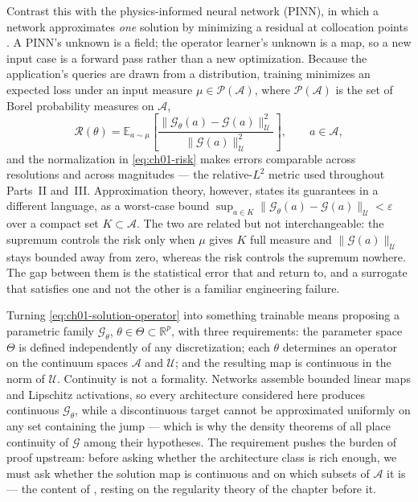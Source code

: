 Contrast this with the physics-informed neural
network (PINN), in which a network approximates
\emph{one} solution by minimizing a residual at collocation points
\cite{raissi2019physics}. A PINN's unknown is a field; the operator learner's unknown is a
map, so a new input case is a forward pass rather than a new optimization. Because the
application's queries are drawn from a distribution, training minimizes
an expected loss under an input measure
$\mu \in \mathcal{P}(\mathcal{A})$, where $\mathcal{P}(\mathcal{A})$ is the set of Borel
probability measures on $\mathcal{A}$,
\begin{equation}
  \label{eq:ch01-risk}
  \mathcal{R}(\theta)
  = \mathbb{E}_{a \sim \mu}
    \left[ \frac{\big\|\mathcal{G}_{\theta}(a) - \mathcal{G}(a)\big\|_{\mathcal{U}}^{2}}
                {\big\|\mathcal{G}(a)\big\|_{\mathcal{U}}^{2}} \right],
    \qquad a \in \mathcal{A},
\end{equation}
and the normalization in \eqref{eq:ch01-risk} makes errors comparable across resolutions and
across magnitudes --- the relative-$L^{2}$ metric used throughout Parts~II and~III. Approximation
theory, however, states its guarantees in a different language, as a worst-case bound $\sup_{a \in K} \|\mathcal{G}_{\theta}(a) -
\mathcal{G}(a)\|_{\mathcal{U}} < \varepsilon$ over a compact set $K \subset \mathcal{A}$. The
two are related but not interchangeable: the supremum controls the risk only when $\mu$ gives
$K$ full measure and $\|\mathcal{G}(a)\|_{\mathcal{U}}$ stays bounded away from zero, whereas
the risk controls the supremum nowhere. The gap between them is the statistical
error that  and
 return to, and a surrogate that
satisfies one and not the other is a familiar engineering failure.

Turning \eqref{eq:ch01-solution-operator} into something trainable means proposing a
parametric family $\mathcal{G}_{\theta}$, $\theta \in \Theta \subset \mathbb{R}^{p}$, with
three requirements: the parameter space $\Theta$ is defined independently of any
discretization; each $\theta$ determines an operator on the continuum spaces
$\mathcal{A}$ and $\mathcal{U}$; and the resulting map is continuous in the norm of
$\mathcal{U}$. Continuity is not a formality. Networks assemble bounded linear maps and
Lipschitz activations, so every architecture considered here produces continuous
$\mathcal{G}_{\theta}$, while a discontinuous target cannot be approximated uniformly on any
set containing the jump --- which is why the density theorems of
\cite{chen1995universal, kovachki2021universal} all place continuity of $\mathcal{G}$ among
their hypotheses. The requirement pushes the burden of proof upstream: before asking whether
the architecture class is rich enough, we must ask whether the solution map is continuous and
on which subsets of $\mathcal{A}$ it is --- the content of
, resting on the regularity
theory of the chapter before it.

